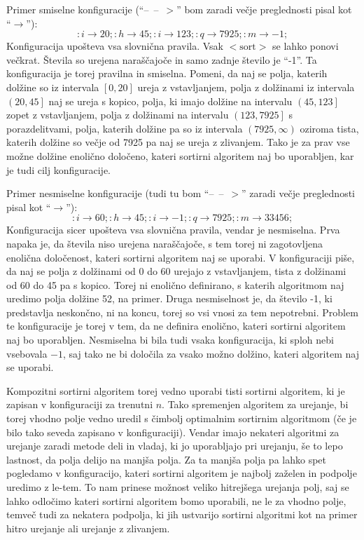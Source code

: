 \documentclass[a4paper,oneside]{article}
\newcommand{\ntm}[1]{\ensuremath{<\!\!\text{#1}\!\!>}}
\newcommand{\konfarrow}{\mbox{--}\ \mbox{--}\ \mbox{\ensuremath{>}}}
\newcommand{\lra}{\ensuremath{\longrightarrow}}
\begin{document}
Primer smiselne konfiguracije (``\konfarrow'' bom zaradi večje preglednosti pisal kot
``\lra''):
\[ :i \lra 20;:h \lra 45;:i \lra 123;:q \lra 7925;:m \lra -1; \]
Konfiguracija upošteva vsa slovnična pravila. Vsak \ntm{sort} se lahko ponovi večkrat.
Števila so urejena naraščajoče in samo zadnje število je ``-1''. Ta konfiguracija je torej
pravilna in smiselna. Pomeni, da naj se polja, katerih dolžine so iz intervala $\left[0,
20\right]$ ureja z vstavljanjem, polja z dolžinami iz intervala $\left(20, 45\right]$ naj
se ureja s kopico, polja, ki imajo dolžine na intervalu $\left(45, 123\right]$ zopet z vstavljanjem,
polja z dolžinami na intervalu $\left(123, 7925\right]$ s porazdelitvami, polja, katerih dolžine pa so iz
intervala $\left(7925, \infty\right)$ oziroma tista, katerih dolžine so večje od 7925
pa naj se ureja z zlivanjem. Tako je za prav vse možne dolžine enolično določeno, kateri
sortirni algoritem naj bo uporabljen, kar je tudi cilj konfiguracije.

Primer nesmiselne konfiguracije (tudi tu bom ``\konfarrow'' zaradi večje preglednosti pisal kot
``\lra''):
\[ :i \lra 60;:h \lra 45;:i \lra -1;:q \lra 7925;:m \lra 33456; \]
Konfiguracija sicer upošteva vsa slovnična pravila, vendar je nesmiselna. Prva napaka je,
da števila niso urejena naraščajoče, s tem torej ni zagotovljena enolična določenost,
kateri sortirni algoritem naj se uporabi. V konfiguraciji piše, da naj se polja z
dolžinami od 0 do 60 urejajo z vstavljanjem, tista z dolžinami od 60 do 45 pa s kopico.
Torej ni enolično definirano, s katerih algoritmom naj uredimo polja dolžine 52, na primer. 
Druga nesmiselnost je, da število -1, ki predstavlja neskončno, ni na koncu, torej so
vsi vnosi za tem nepotrebni. Problem te konfiguracije je torej v tem, da ne definira
enolično, kateri sortirni algoritem naj bo uporabljen. Nesmiselna bi bila tudi vsaka
konfiguracija, ki sploh nebi vsebovala $-1$, saj tako ne bi določila za vsako možno
dolžino, kateri algoritem naj se uporabi.

Kompozitni sortirni algoritem torej vedno uporabi tisti sortirni algoritem, ki je zapisan
v konfiguraciji za trenutni $n$. Tako spremenjen algoritem za urejanje, bi torej vhodno
polje vedno uredil s čimbolj optimalnim sortirnim algoritmom (če je bilo tako seveda
zapisano v konfiguraciji). Vendar imajo nekateri algoritmi za urejanje zaradi metode deli in vladaj,
ki jo uporabljajo pri urejanju, še to lepo lastnost, da polja delijo na manjša polja. Za
ta manjša polja pa lahko spet pogledamo v konfiguracijo, kateri sortirni algoritem je
najbolj zaželen in podpolje uredimo z le-tem. To nam prinese možnost veliko hitrejšega
urejanja polj, saj se lahko odločimo kateri sortirni algoritem bomo
uporabili, ne le za vhodno polje, temveč tudi za nekatera podpolja, ki jih ustvarijo
sortirni algoritmi kot na primer hitro urejanje ali urejanje z zlivanjem.
\end{document}
